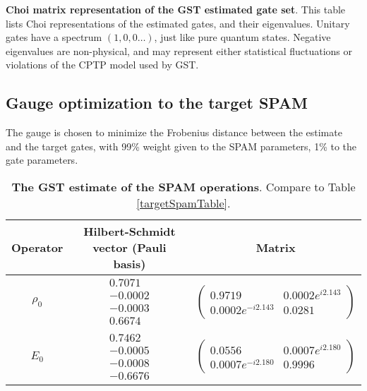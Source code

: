 {\begin{table}[h]
\begin{center}
\caption{\textbf{Choi matrix representation of the GST estimated gate set}.  This table lists Choi representations of the estimated gates, and their eigenvalues.  Unitary gates have a spectrum $(1,0,0\ldots)$, just like pure quantum states.  Negative eigenvalues are non-physical, and may represent either statistical fluctuations or violations of the CPTP model used by GST.\label{bestTargetGatesetChoiTable}}
\end{center}
\end{table}


\clearpage

\subsection{Gauge optimization to the target SPAM}
The gauge is chosen to minimize the Frobenius distance between the estimate and the target gates, with 99\% weight given to the SPAM parameters, 1\% to the gate parameters.

\begin{table}[h]
\begin{center}
\begin{tabular}[l]{|c|c|c|}
\hline
Operator & Hilbert-Schmidt vector (Pauli basis) & Matrix \\ \hline
$\rho_{0}$ & $ \begin{array}{c}
0.7071 \\ 
-0.0002 \\ 
-0.0003 \\ 
0.6674
 \end{array} $
 & $ \left(\!\!\begin{array}{cc}
0.9719 & 0.0002e^{i2.143} \\ 
0.0002e^{-i2.143} & 0.0281
 \end{array}\!\!\right) $
 \\ \hline
$E_{0}$ & $ \begin{array}{c}
0.7462 \\ 
-0.0005 \\ 
-0.0008 \\ 
-0.6676
 \end{array} $
 & $ \left(\!\!\begin{array}{cc}
0.0556 & 0.0007e^{i2.180} \\ 
0.0007e^{-i2.180} & 0.9996
 \end{array}\!\!\right) $
 \\ \hline
\end{tabular}

\caption{\textbf{The GST estimate of the SPAM operations}.  Compare to Table \ref{targetSpamTable}.\label{bestTargetSpamGatesetSpamTable}}
\end{center}
\end{table}

}
